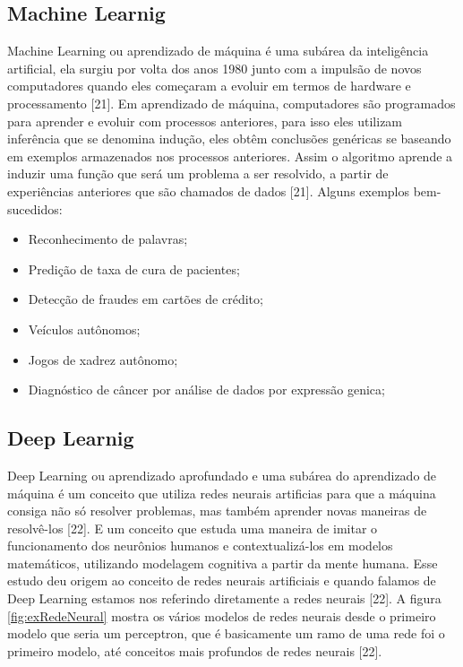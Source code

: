 \subsection{Machine Learnig}
Machine Learning ou aprendizado de máquina é uma subárea da inteligência artificial, ela surgiu por volta dos anos 1980 junto com a impulsão de novos computadores quando eles começaram a evoluir em termos de hardware e processamento [21]. Em aprendizado de máquina, computadores são programados para aprender e evoluir com processos anteriores, para isso eles utilizam inferência que se denomina indução, eles obtêm conclusões genéricas se baseando em exemplos armazenados nos processos anteriores. Assim o algoritmo aprende a induzir uma função que será um problema a ser resolvido, a partir de experiências anteriores que são chamados de dados [21]. Alguns exemplos bem-sucedidos:
\begin{itemize}
    \item Reconhecimento de palavras;
    \item Predição de taxa de cura de pacientes;
    \item Detecção de fraudes em cartões de crédito;
    \item Veículos autônomos;
    \item Jogos de xadrez autônomo;
    \item Diagnóstico de câncer por análise de dados por expressão genica;
\end{itemize}
\subsection{Deep Learnig}
Deep Learning ou aprendizado aprofundado e uma subárea do aprendizado de máquina é um conceito que utiliza redes neurais artificias para que a máquina consiga não só resolver problemas, mas também aprender novas maneiras de resolvê-los [22].  E um conceito que estuda uma maneira de imitar o funcionamento dos neurônios humanos e contextualizá-los em modelos matemáticos, utilizando modelagem cognitiva a partir da mente humana. Esse estudo deu origem ao conceito de redes neurais artificiais e quando falamos de Deep Learning estamos nos referindo diretamente a redes neurais [22].
A figura \ref{fig:exRedeNeural} mostra os vários modelos de redes neurais desde o primeiro modelo que seria um perceptron, que é basicamente um ramo de uma rede foi o primeiro modelo, até conceitos mais profundos de redes neurais [22].

